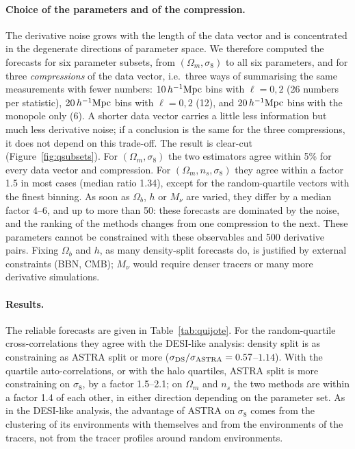 \paragraph{Choice of the parameters and of the compression.} The derivative noise grows with the length of the data vector and is concentrated in the degenerate directions of parameter space. We therefore computed the forecasts for six parameter subsets, from $(\Omega_m,\sigma_8)$ to all six parameters, and for three \emph{compressions} of the data vector, i.e.\ three ways of summarising the same measurements with fewer numbers: $10\,h^{-1}\mathrm{Mpc}$ bins with $\ell=0,2$ (26 numbers per statistic), $20\,h^{-1}\mathrm{Mpc}$ bins with $\ell=0,2$ (12), and $20\,h^{-1}\mathrm{Mpc}$ bins with the monopole only (6). A shorter data vector carries a little less information but much less derivative noise; if a conclusion is the same for the three compressions, it does not depend on this trade-off. The result is clear-cut (Figure~\ref{fig:qsubsets}). For $(\Omega_m,\sigma_8)$ the two estimators agree within 5\% for every data vector and compression. For $(\Omega_m,n_s,\sigma_8)$ they agree within a factor 1.5 in most cases (median ratio 1.34), except for the random-quartile vectors with the finest binning. As soon as $\Omega_b$, $h$ or $M_\nu$ are varied, they differ by a median factor 4--6, and up to more than 50: these forecasts are dominated by the noise, and the ranking of the methods changes from one compression to the next. These parameters cannot be constrained with these observables and 500 derivative pairs. Fixing $\Omega_b$ and $h$, as many density-split forecasts do, is justified by external constraints (BBN, CMB); $M_\nu$ would require denser tracers or many more derivative simulations.

\paragraph{Results.} The reliable forecasts are given in Table~\ref{tab:quijote}. For the random-quartile cross-correlations they agree with the DESI-like analysis: density split is as constraining as ASTRA split or more ($\sigma_{\rm DS}/\sigma_{\rm ASTRA}=0.57$--$1.14$). With the quartile auto-correlations, or with the halo quartiles, ASTRA split is more constraining on $\sigma_8$, by a factor 1.5--2.1; on $\Omega_m$ and $n_s$ the two methods are within a factor 1.4 of each other, in either direction depending on the parameter set. As in the DESI-like analysis, the advantage of ASTRA on $\sigma_8$ comes from the clustering of its environments with themselves and from the environments of the tracers, not from the tracer profiles around random environments.

